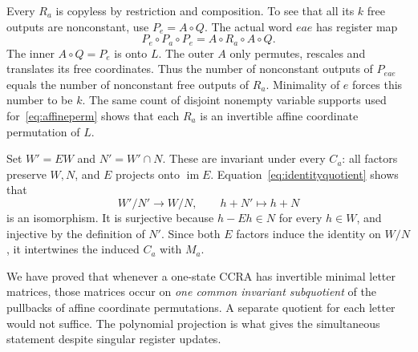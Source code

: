 \documentclass[acmlarge,screen,11pt,nonacm]{acmart}
\newcommand{\im}{\operatorname{im}}
\theoremstyle{definition}
\begin{document}
Every $R_a$ is copyless by restriction and composition. To see that all its $k$ free outputs are nonconstant, use $P_e=A\circ Q$. The actual word $eae$ has register map
\[
 P_e\circ P_a\circ P_e=A\circ R_a\circ A\circ Q.
\]
The inner $A\circ Q=P_e$ is onto $L$. The outer $A$ only permutes, rescales and translates its free coordinates. Thus the number of nonconstant outputs of $P_{eae}$ equals the number of nonconstant free outputs of $R_a$. Minimality of $e$ forces this number to be $k$. The same count of disjoint nonempty variable supports used for~\eqref{eq:affineperm} shows that each $R_a$ is an invertible affine coordinate permutation of $L$.

Set $W'=EW$ and $N'=W'\cap N$. These are invariant under every $C_a$: all factors preserve $W,N$, and $E$ projects onto $\im E$. Equation~\eqref{eq:identityquotient} shows that
\begin{equation}\label{eq:isomorphism}
 W'/N'\longrightarrow W/N,\qquad h+N'\longmapsto h+N
\end{equation}
is an isomorphism. It is surjective because $h-Eh\in N$ for every $h\in W$, and injective by the definition of $N'$. Since both $E$ factors induce the identity on $W/N$, it intertwines the induced $C_a$ with $M_a$.

We have proved that whenever a one-state CCRA has invertible minimal letter matrices, those matrices occur on \emph{one common invariant subquotient} of the pullbacks of affine coordinate permutations. A separate quotient for each letter would not suffice. The polynomial projection is what gives the simultaneous statement despite singular register updates.
\end{document}
